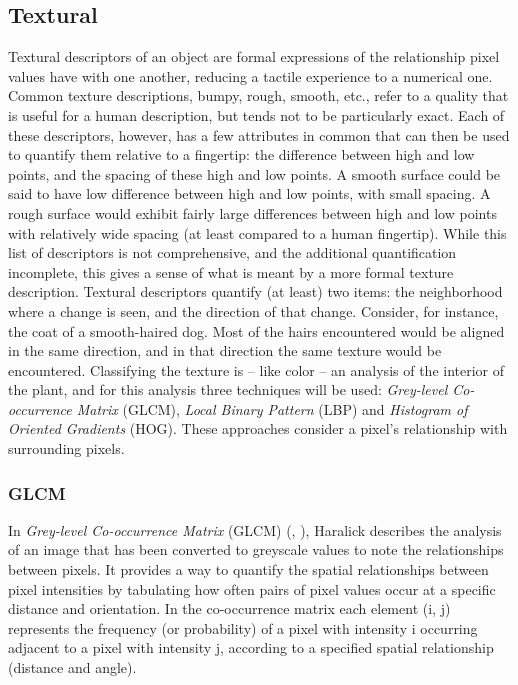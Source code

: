 \documentclass[letterpaper]{report}
\begin{document}
\subsection{Textural}
Textural descriptors of an object are formal expressions of the relationship pixel values have with one another, reducing a tactile experience to a numerical one. Common texture descriptions, bumpy, rough, smooth, etc., refer to a quality that is useful for a human description, but tends not to be particularly exact. Each of these descriptors, however, has a few attributes in common that can then be used to quantify them relative to a fingertip: the difference between high and low points, and the spacing of these high and low points. A smooth surface could be said to have low difference between high and low points, with small spacing. A rough surface would exhibit fairly large differences between high and low points with relatively wide spacing (at least compared to a human fingertip). While this list of descriptors is not comprehensive, and the additional quantification incomplete, this gives a sense of what is meant by a more formal texture description. Textural descriptors quantify (at least) two items: the neighborhood where a change is seen, and the direction of that change. Consider, for instance, the coat of a smooth-haired dog. Most of the hairs encountered would be aligned in the same direction, and in that direction the same texture would be encountered.
Classifying the texture is -- like color -- an analysis of the interior of the plant, and for this analysis three techniques will be used:  \textit{Grey-level Co-occurrence Matrix} (GLCM), \textit{Local Binary Pattern} (LBP) and \textit{Histogram of Oriented Gradients} (HOG). These approaches consider a pixel's relationship with surrounding pixels. 

\subsubsection{GLCM}
In \textit{Grey-level Co-occurrence Matrix} (GLCM) (\cite{Haralick1973-gr}, \cite{Hall-Beyer2017-nx}), Haralick describes the analysis of an image that has been converted to greyscale values to note the relationships between pixels. It provides a way to quantify the spatial relationships between pixel intensities by tabulating how often pairs of pixel values occur at a specific distance and orientation. In the co-occurrence matrix each element (i, j) represents the frequency (or probability) of a pixel with intensity i occurring adjacent to a pixel with intensity j, according to a specified spatial relationship (distance and angle).
\end{document}
